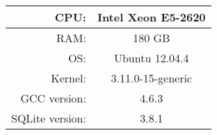 
\begin{table}[ht]
\centering
\label{table:performance:testing-platform}
\begin{tabular}{|c|c|}

\hline
\multicolumn{1}{|r|}{CPU:} &
\multicolumn{1}{c|}{Intel Xeon E5-2620} \\

\hline
\multicolumn{1}{|r|}{RAM:} &
\multicolumn{1}{c|}{180 GB} \\

\hline
\multicolumn{1}{|r|}{OS:} &
\multicolumn{1}{c|}{Ubuntu 12.04.4} \\

\hline
\multicolumn{1}{|r|}{Kernel:} &
\multicolumn{1}{c|}{3.11.0-15-generic} \\

\hline
\multicolumn{1}{|r|}{GCC version:} &
\multicolumn{1}{c|}{4.6.3} \\

\hline
\multicolumn{1}{|r|}{SQLite version:} &
\multicolumn{1}{c|}{3.8.1} \\

\hline
\end{tabular}
\end{table}

